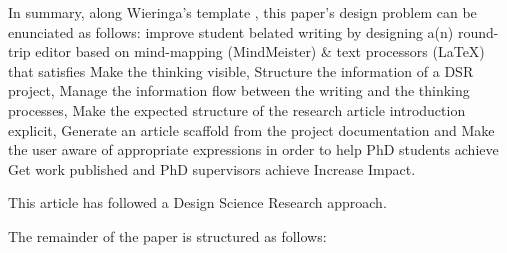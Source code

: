 \documentclass{article}
\newcommand{\todo}[1] {\iffalse #1 \fi} %
\begin{document}
In summary, along Wieringa's template \cite{Wieringa2014}, this paper's design problem can be enunciated as follows: 
improve student belated writing
by designing a(n) round-trip editor based on mind-mapping (MindMeister) & text processors (LaTeX)
that satisfies Make the thinking visible, Structure the information of a DSR project, Manage the information flow between the writing and the thinking processes, Make the expected structure of the research article introduction explicit, Generate an article scaffold from the project documentation and Make the user aware of appropriate expressions
in order to help PhD students achieve Get work published and PhD supervisors achieve Increase Impact.  \todo{idea: esto puede ser debido a causa 3}
    

      
This article has followed a Design Science Research approach.

The remainder of the paper is structured as follows: 

    
      


\end{document}
